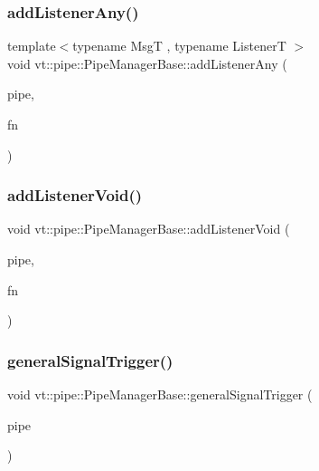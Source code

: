 \subsubsection{\texorpdfstring{add\+Listener\+Any()}{addListenerAny()}}
{\footnotesize\ttfamily template$<$typename MsgT , typename ListenerT $>$ \\
void vt\+::pipe\+::\+Pipe\+Manager\+Base\+::add\+Listener\+Any (\begin{DoxyParamCaption}\item[{\hyperlink{namespacevt_ac9852acda74d1896f48f406cd72c7bd3}{Pipe\+Type} const \&}]{pipe,  }\item[{ListenerT \&\&}]{fn }\end{DoxyParamCaption})\hspace{0.3cm}{\ttfamily [protected]}}

\mbox{\label{structvt_1_1pipe_1_1_pipe_manager_base_ae486f94f76733fd3d97ff393c35d0e5e}} 
\subsubsection{\texorpdfstring{add\+Listener\+Void()}{addListenerVoid()}}
{\footnotesize\ttfamily void vt\+::pipe\+::\+Pipe\+Manager\+Base\+::add\+Listener\+Void (\begin{DoxyParamCaption}\item[{\hyperlink{namespacevt_ac9852acda74d1896f48f406cd72c7bd3}{Pipe\+Type} const \&}]{pipe,  }\item[{\hyperlink{structvt_1_1pipe_1_1_pipe_manager_base_a7ddc75a14fa50cd8521641ef6f9ea78d}{Func\+Type}}]{fn }\end{DoxyParamCaption})}

\mbox{\label{structvt_1_1pipe_1_1_pipe_manager_base_a27d24548529db938aeeb6fe11af985a1}} 
\subsubsection{\texorpdfstring{general\+Signal\+Trigger()}{generalSignalTrigger()}}
{\footnotesize\ttfamily void vt\+::pipe\+::\+Pipe\+Manager\+Base\+::general\+Signal\+Trigger (\begin{DoxyParamCaption}\item[{\hyperlink{namespacevt_ac9852acda74d1896f48f406cd72c7bd3}{Pipe\+Type} const \&}]{pipe }\end{DoxyParamCaption})\hspace{0.3cm}{\ttfamily [protected]}}

